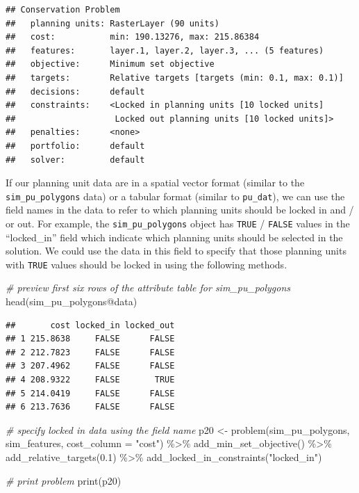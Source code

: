 \documentclass[
  12pt,
]{book}
\newenvironment{Shaded}{\begin{snugshade}}{\end{snugshade}}
\newcommand{\AttributeTok}[1]{\textcolor[rgb]{0.77,0.63,0.00}{#1}}
\newcommand{\CommentTok}[1]{\textcolor[rgb]{0.56,0.35,0.01}{\textit{#1}}}
\newcommand{\FloatTok}[1]{\textcolor[rgb]{0.00,0.00,0.81}{#1}}
\newcommand{\FunctionTok}[1]{\textcolor[rgb]{0.00,0.00,0.00}{#1}}
\newcommand{\NormalTok}[1]{#1}
\newcommand{\OtherTok}[1]{\textcolor[rgb]{0.56,0.35,0.01}{#1}}
\newcommand{\SpecialCharTok}[1]{\textcolor[rgb]{0.00,0.00,0.00}{#1}}
\newcommand{\StringTok}[1]{\textcolor[rgb]{0.31,0.60,0.02}{#1}}
\begin{document}
\begin{verbatim}
## Conservation Problem
##   planning units: RasterLayer (90 units)
##   cost:           min: 190.13276, max: 215.86384
##   features:       layer.1, layer.2, layer.3, ... (5 features)
##   objective:      Minimum set objective 
##   targets:        Relative targets [targets (min: 0.1, max: 0.1)]
##   decisions:      default
##   constraints:    <Locked in planning units [10 locked units]
##                    Locked out planning units [10 locked units]>
##   penalties:      <none>
##   portfolio:      default
##   solver:         default
\end{verbatim}

If our planning unit data are in a spatial vector format (similar to the \texttt{sim\_pu\_polygons} data) or a tabular format (similar to \texttt{pu\_dat}), we can use the field names in the data to refer to which planning units should be locked in and / or out. For example, the \texttt{sim\_pu\_polygons} object has \texttt{TRUE} / \texttt{FALSE} values in the ``locked\_in'' field which indicate which planning units should be selected in the solution. We could use the data in this field to specify that those planning units with \texttt{TRUE} values should be locked in using the following methods.

\begin{Shaded}
\begin{Highlighting}[]
\CommentTok{\# preview first six rows of the attribute table for sim\_pu\_polygons}
\FunctionTok{head}\NormalTok{(sim\_pu\_polygons}\SpecialCharTok{@}\NormalTok{data)}
\end{Highlighting}
\end{Shaded}

\begin{verbatim}
##       cost locked_in locked_out
## 1 215.8638     FALSE      FALSE
## 2 212.7823     FALSE      FALSE
## 3 207.4962     FALSE      FALSE
## 4 208.9322     FALSE       TRUE
## 5 214.0419     FALSE      FALSE
## 6 213.7636     FALSE      FALSE
\end{verbatim}

\begin{Shaded}
\begin{Highlighting}[]
\CommentTok{\# specify locked in data using the field name}
\NormalTok{p20 }\OtherTok{\textless{}{-}} \FunctionTok{problem}\NormalTok{(sim\_pu\_polygons, sim\_features, }\AttributeTok{cost\_column =} \StringTok{"cost"}\NormalTok{) }\SpecialCharTok{\%\textgreater{}\%}
       \FunctionTok{add\_min\_set\_objective}\NormalTok{() }\SpecialCharTok{\%\textgreater{}\%}
       \FunctionTok{add\_relative\_targets}\NormalTok{(}\FloatTok{0.1}\NormalTok{) }\SpecialCharTok{\%\textgreater{}\%}
       \FunctionTok{add\_locked\_in\_constraints}\NormalTok{(}\StringTok{"locked\_in"}\NormalTok{)}

\CommentTok{\# print problem}
\FunctionTok{print}\NormalTok{(p20)}
\end{Highlighting}
\end{Shaded}
\end{document}
